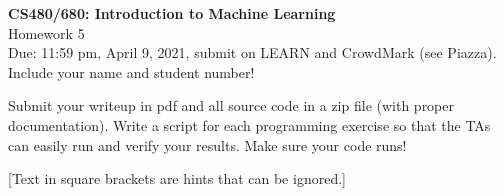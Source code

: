 \documentclass[10pt,letter,notitlepage]{article}
\newcommand{\red}[1]{{\color{red}#1}}
\newcounter{exercise}
\begin{document}
\begin{center}
\large{\textbf{CS480/680: Introduction to Machine Learning} \\ Homework 5\\ \red{Due: 11:59 pm, April 9, 2021}, \red{submit on LEARN and CrowdMark (see Piazza)}.} \\

Include your name and student number!

\end{center}

\begin{center}
Submit your writeup in pdf and all source code in a zip file (with proper documentation). Write a script for each programming exercise so that the TAs can easily run and verify your results. Make sure your code runs!

[Text in square brackets are hints that can be ignored.]
\end{center}
\end{document}
